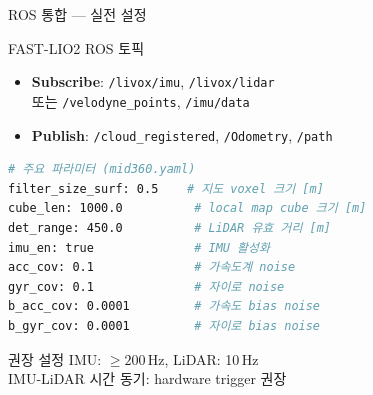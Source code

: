 \begin{frame}[fragile]{ROS 통합 — 실전 설정}
  \begin{block}{FAST-LIO2 ROS 토픽}
    \begin{itemize}
      \item \textbf{Subscribe}: \texttt{/livox/imu}, \texttt{/livox/lidar}\\
        또는 \texttt{/velodyne\_points}, \texttt{/imu/data}
      \item \textbf{Publish}: \texttt{/cloud\_registered}, \texttt{/Odometry}, \texttt{/path}
    \end{itemize}
  \end{block}
  \pause
\begin{lstlisting}[language=bash]
# 주요 파라미터 (mid360.yaml)
filter_size_surf: 0.5    # 지도 voxel 크기 [m]
cube_len: 1000.0          # local map cube 크기 [m]
det_range: 450.0          # LiDAR 유효 거리 [m]
imu_en: true              # IMU 활성화
acc_cov: 0.1              # 가속도계 noise
gyr_cov: 0.1              # 자이로 noise
b_acc_cov: 0.0001         # 가속도 bias noise
b_gyr_cov: 0.0001         # 자이로 bias noise
\end{lstlisting}
  \begin{exampleblock}{권장 설정}
    IMU: $\geq200\,$Hz, LiDAR: 10\,Hz\\
    IMU-LiDAR 시간 동기: hardware trigger 권장
  \end{exampleblock}
\end{frame}

